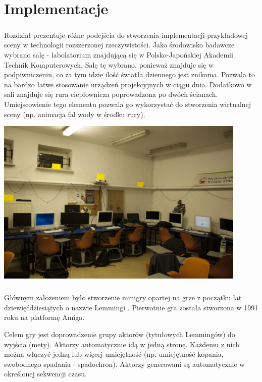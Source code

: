 \chapter{Implementacje}
\paragraph{}
Rozdział prezentuje różne podejścia do stworzenia implementacji przykładowej sceny  w technologii rozszerzonej rzeczywistości.
Jako środowisko badawcze wybrano salę - labolatorium znajdującą się w Polsko-Japońskiej Akademii Technik Komputerowych. Salę tę wybrano, ponieważ znajduje się w podpiwniczeniu, co za tym idzie ilość światła dziennego jest znikoma. Pozwala to na bardzo łatwe stosowanie urządzeń projekcyjnych w ciągu dnia. Dodatkowo w sali znajduje się rura ciepłownicza poprowadzona po dwóch ścianach. Umiejscowienie tego elementu pozwala go wykorzystać do stworzenia wirtualnej sceny (np. animacja fal wody w środku rury).

\begin{center}
\includegraphics[width=0.9\textwidth]{images/s9.jpg}
\end{center}

\paragraph{}
Głównym założeniem było stworzenie minigry opartej na grze z początku lat dziewięćdziesiątych o nazwie Lemmingi \cite{lemmings}. Pierwotnie gra została stworzona w 1991 roku na platformę Amiga.

Celem gry jest doprowadzenie grupy aktorów (tytułowych Lemmingów) do wyjścia (mety). Aktorzy automatycznie idą w jedną stronę. Każdemu z nich można włączyć jedną lub więcej umiejętność (np. umiejętność kopania, swobodnego spadania - spadochron). Aktorzy generowani są automatycznie w określonej sekwencji czasu.

